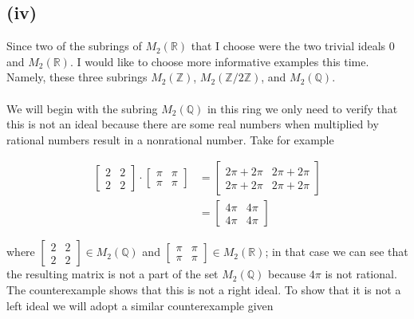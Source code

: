 \documentclass{article}
\begin{document}
      \subsection*{(iv)}
        Since two of the subrings of $M_2(\mathbb{R})$ that I choose were the two trivial ideals $0$ and $M_2(\mathbb{R})$. I would like to choose more informative examples this time. Namely, these three subrings $M_2(\mathbb{Z})$, $M_2(\mathbb{Z}/2\mathbb{Z})$, and $M_2(\mathbb{Q})$.

        \paragraph{} We will begin with the subring $M_2(\mathbb{Q})$ in this ring we only need to verify that this is not an ideal because there are some real numbers when multiplied by rational numbers result in a nonrational number. Take for example

        \[
          \begin{split}
            \begin{bmatrix}2 & 2 \\ 2 & 2\end{bmatrix} \cdot \begin{bmatrix}\pi & \pi \\ \pi & \pi\end{bmatrix} &= \begin{bmatrix}2\pi + 2\pi & 2\pi + 2\pi \\ 2\pi + 2\pi & 2\pi + 2\pi\end{bmatrix}\\
            &= \begin{bmatrix}4\pi & 4\pi \\ 4\pi & 4\pi \end{bmatrix}
          \end{split}
        \]

        \noindent where $\begin{bmatrix}2 & 2 \\ 2 & 2\end{bmatrix} \in M_2(\mathbb{Q})$ and $\begin{bmatrix}\pi & \pi \\ \pi & \pi\end{bmatrix} \in M_2(\mathbb{R})$; in that case we can see that the resulting matrix is not a part of the set $M_2(\mathbb{Q})$ because $4\pi$ is not rational. The counterexample shows that this is not a right ideal. To show that it is not a left ideal we will adopt a similar counterexample given
\end{document}
